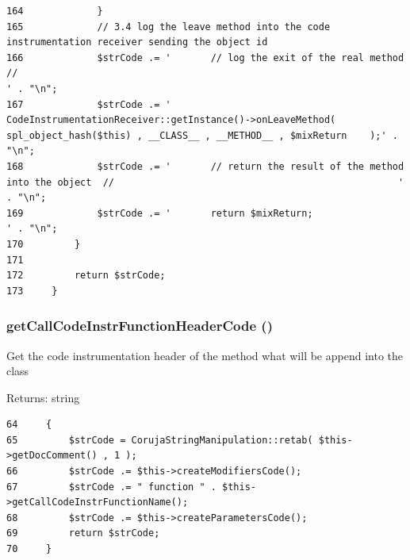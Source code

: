 \begin{Code}
\begin{verbatim}
164             }
165             // 3.4 log the leave method into the code instrumentation receiver sending the object id
166             $strCode .= '       // log the exit of the real method //                                                                                   ' . "\n";
167             $strCode .= '       CodeInstrumentationReceiver::getInstance()->onLeaveMethod( spl_object_hash($this) , __CLASS__ , __METHOD__ , $mixReturn    );' . "\n";
168             $strCode .= '       // return the result of the method into the object  //                                                  ' . "\n";
169             $strCode .= '       return $mixReturn;                                                                                                                              ' . "\n";
170         }
171 
172         return $strCode;
173     }
\end{verbatim}
\end{Code}


\hypertarget{class_code_instrumentation_method_bd8673f90786848f90fb3c0940c604a6}{
\subsubsection[{getCallCodeInstrFunctionHeaderCode}]{\setlength{\rightskip}{0pt plus 5cm}getCallCodeInstrFunctionHeaderCode ()}}
\label{class_code_instrumentation_method_bd8673f90786848f90fb3c0940c604a6}


Get the code instrumentation header of the method what will be append into the class

\begin{Desc}
\item[Returns:]string \end{Desc}


\begin{Code}\begin{verbatim}64     {
65         $strCode = CorujaStringManipulation::retab( $this->getDocComment() , 1 );
66         $strCode .= $this->createModifiersCode();
67         $strCode .= " function " . $this->getCallCodeInstrFunctionName();
68         $strCode .= $this->createParametersCode();
69         return $strCode;
70     }
\end{verbatim}
\end{Code}


